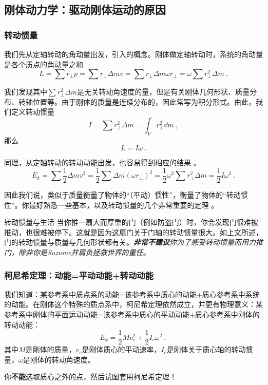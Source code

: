 \subsection{刚体动力学：驱动刚体运动的原因}
\subsubsection{转动惯量}
我们先从定轴转动的角动量出发，引入的概念。刚体做定轴转动时，系统的角动量是各个质点的角动量之和
$$L = \sum r_\perp p = \sum r_\perp \Delta m v = \sum r_\perp \Delta m \omega r_\perp = \omega \sum r_\perp^2 \Delta m~.$$

我们发现其中$\sum r_\perp^2 \Delta m$是无关转动角速度的量，但是有关刚体几何形状、质量分布、转轴位置等。由于刚体的质量是连续分布的，因此常写为积分形式。由此，我们定义转动惯量
$$
I =\sum r_\perp^2 \Delta m = \int_V r_\perp^2 \dd m~,
$$
那么
$$ L = I \omega~.$$

同理，从定轴转动的转动动能出发，也容易得到相应的结果 。
$$E_k = \sum \frac{1}{2} \Delta m v^2 = \frac{1}{2} \sum \Delta m (\omega r_\perp)^2 = \frac{1}{2} \omega^2 \sum r_\perp^2 \Delta m = \frac{1}{2} I \omega^2~.$$

因此我们说，类似于质量衡量了物体的“（平动）惯性”，衡量了物体的“转动惯性”。你最好熟悉一些基本，以及转动惯量的几个非常重要的定理 。

\begin{example}{转动惯量与生活}
当你推一扇大而厚重的门（例如防盗门）时，你会发现门很难被推动，也很难被停下。这就是因为这扇门关于门轴的转动惯量很大。如上文所述，门的转动惯量与质量与几何形状都有关。\textsl{\textbf{非常不建议}你为了感受转动惯量而用力推门，除非你是Suzume并肩负拯救世界的重任。}
\end{example}

\subsubsection{柯尼希定理：动能=平动动能+转动动能}
我们知道：某参考系中质点系的动能=该参考系中质心的动能+质心参考系中系统的动能。在刚体这个特殊的质点系中，柯尼希定理依然成立，并更有物理意义：某参考系中刚体的平面运动动能=该参考系中质心的平动动能+质心参考系中刚体的转动动能：
$$E_k = \frac{1}{2}Mv_c^2 + \frac{1}{2} I_c \omega^2~,$$
其中$M$是刚体的质量，$v_c$是刚体质心的平动速率，$I_c$是刚体关于质心轴的转动惯量，$\omega$是刚体的转动角速度。

你\textbf{不能}选取质心之外的点，然后试图套用柯尼希定理！

